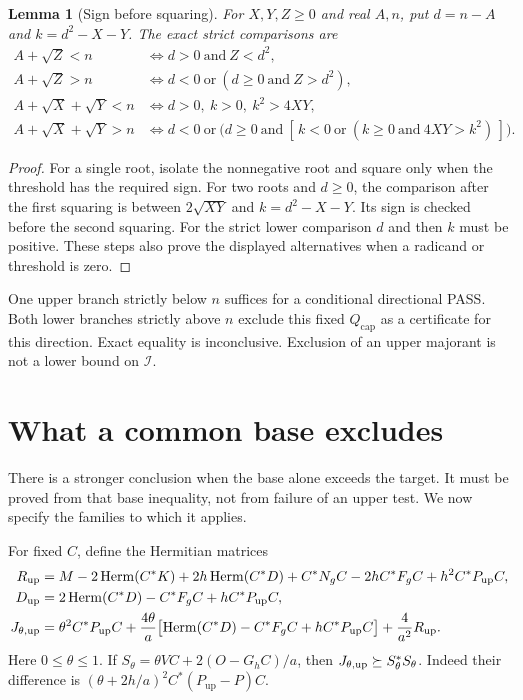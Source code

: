 \documentclass[11pt,a4paper]{article}
\newcommand{\Herm}{\operatorname{Herm}}
\newcommand{\Pup}{P_{\mathrm{up}}}
\newcommand{\Qcap}{Q_{\mathrm{cap}}}
\newcommand{\Iresp}{\mathcal I}
\newcommand{\pass}{\textsf{PASS}}
\newtheorem{lemma}[theorem]{Lemma}
\theoremstyle{definition}
\theoremstyle{remark}
\numberwithin{equation}{section}
\begin{document}
\begin{lemma}[Sign before squaring]\label{lem:strict}
For $X,Y,Z\ge0$ and real $A,n$, put $d=n-A$ and
$k=d^2-X-Y$. The exact strict comparisons are
\begin{align*}
 A+\sqrt Z<n
 &\iff d>0\ \text{and}\ Z<d^2,\\
 A+\sqrt Z>n
 &\iff d<0\ \text{or}\ (d\ge0\ \text{and}\ Z>d^2),\\
 A+\sqrt X+\sqrt Y<n
 &\iff d>0,\ k>0,\ k^2>4XY,\\
 A+\sqrt X+\sqrt Y>n
 &\iff d<0\ \text{or}\
   \bigl(d\ge0\ \text{and}\
       [\,k<0\ \text{or}\ (k\ge0\ \text{and}\ 4XY>k^2)\,]\bigr).
\end{align*}
\end{lemma}
\begin{proof}
For a single root, isolate the nonnegative root and square only when the
threshold has the required sign. For two roots and $d\ge0$, the comparison
after the first squaring is between $2\sqrt{XY}$ and
$k=d^2-X-Y$. Its sign is checked before the second squaring. For the
strict lower comparison $d$ and then $k$ must be positive. These steps
also prove the displayed alternatives when a radicand or threshold is
zero.
\end{proof}

One upper branch strictly below $n$ suffices for a conditional directional
\pass. Both lower branches strictly above $n$ exclude this fixed
$\Qcap$ as a certificate for this direction. Exact equality is
inconclusive. Exclusion of an upper majorant is not a lower bound on
$\Iresp$.

\section{What a common base excludes}\label{sec:families}

There is a stronger conclusion when the base alone exceeds the target.
It must be proved from that base inequality, not from failure of an
upper test. We now specify the families to which it applies.

For fixed $C$, define the Hermitian matrices
\begin{align}
 R_{\rm up}
 &=M-2\Herm(C^*K)+2h\Herm(C^*D)+C^*N_gC
                    -2hC^*F_gC+h^2C^*\Pup C,\notag\\
 D_{\rm up}
 &=2\Herm(C^*D)-C^*F_gC+hC^*\Pup C,\notag\\
 J_{\theta,{\rm up}}
 &=\theta^2C^*\Pup C+
   \frac{4\theta}{a}
       \bigl[\Herm(C^*D)-C^*F_gC+hC^*\Pup C\bigr]
       +\frac4{a^2}R_{\rm up}.                  \label{eq:matrixpads}
\end{align}
Here $0\le\theta\le1$. If
$S_\theta=\theta VC+2(O-G_hC)/a$, then
$J_{\theta,{\rm up}}\succeq S_\theta^*S_\theta$.
Indeed their difference is
$(\theta+2h/a)^2C^*(\Pup-P)C$.
\end{document}
